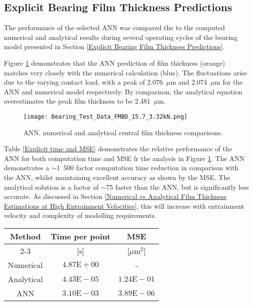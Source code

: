 \subsection{Explicit Bearing Film Thickness Predictions}

The performance of the selected ANN was compared the to the computed numerical and analytical results during several operating cycles of the bearing model presented in Section \ref{Explicit Bearing Film Thickness Predictions}.

Figure \ref{ANN Film Thickness Comparisons} demonstrates that the ANN prediction of film thickness (orange) matches very closely with the numerical calculation (blue). The fluctuations arise due to the varying contact load, with a peak of 2.076~$\mu \mathrm{m}$ and 2.074~$\mu \mathrm{m}$ for the ANN and numerical model respectively. By comparison, the analytical equation overestimates the peak film thickness to be 2.481~$\mu \mathrm{m}$.

\begin{figure}
	\centering
	\texttt{[image: Bearing\_Test\_Data\_FMBD\_15.7\_3.32kN.png]}
	\caption{ANN, numerical and analytical central film thickness comparisons.}
	\label{ANN Film Thickness Comparisons}
\end{figure}

Table \ref{Explicit time and MSE} demonstrates the relative performance of the ANN for both computation time and MSE fr the analysis in Figure \ref{ANN Film Thickness Comparisons}. The ANN demonstrates a $\sim$1~500 factor computation time reduction in comparison with the ANN, whilst maintaining excellent accuracy as shown by the MSE. The analytical solution is a factor of $\sim$75 faster than the ANN, but is significantly less accurate. As discussed in Section \ref{Numerical vs Analytical Film Thickness Estimations at High Entrainment Velocities}, this will increase with entrainment velocity and complexity of modelling requirements.

\begin{table*}
	\caption{Film thickness computation methodology performance relative to the numerical solution}
	\label{Explicit time and MSE}
	\centering
	\renewcommand{\arraystretch}{1.5}%
	\begin{tabular}{|c|c|c|}	
		\hline \multirow{2}{*}{Method} & Time per point & MSE \\
		\cline{2-3} & [$\mathrm{s}$] & [$\mu \mathrm{m}^2$] \\
		\hline Numerical & $4.87 \mathrm{E}+00$ & - \\
		\hline Analytical & $4.43 \mathrm{E}-05$ & $1.24 \mathrm{E}-01$ \\
		\hline ANN & $3.10 \mathrm{E}-03$ & $3.89 \mathrm{E}-06$ \\
		\hline
	\end{tabular}
\end{table*}

